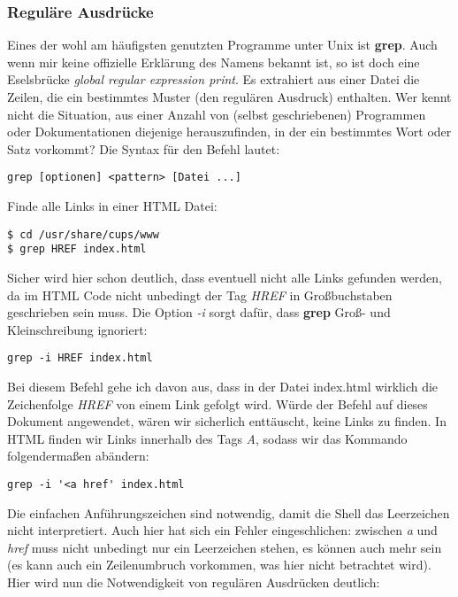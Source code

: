 \documentclass[titlepage,a4paper]{article}
\begin{document}
\subsubsection*{Reguläre Ausdrücke}
\label{sec:regex}

Eines der wohl am häufigsten genutzten Programme unter Unix ist \textbf{grep}.  Auch
wenn mir keine offizielle Erklärung des Namens bekannt ist, so ist doch eine
Eselsbrücke \emph{global regular expression print}.  Es extrahiert aus einer
Datei die Zeilen, die ein bestimmtes Muster (den regulären Ausdruck)
enthalten.  Wer kennt nicht die Situation, aus einer Anzahl von (selbst
geschriebenen) Programmen oder Dokumentationen diejenige herauszufinden, in
der ein bestimmtes Wort oder Satz vorkommt?  Die Syntax für den Befehl lautet:

\begin{verbatim}
grep [optionen] <pattern> [Datei ...]
\end{verbatim}

Finde alle Links in einer HTML Datei:

\begin{verbatim}
$ cd /usr/share/cups/www
$ grep HREF index.html
\end{verbatim}

Sicher wird hier schon deutlich, dass eventuell nicht alle Links gefunden
werden, da im HTML Code nicht unbedingt der Tag \emph{HREF} in Großbuchstaben
geschrieben sein muss.  Die Option \emph{-i} sorgt dafür, dass \textbf{grep}
Groß- und Kleinschreibung ignoriert:

\begin{verbatim}
grep -i HREF index.html
\end{verbatim}

Bei diesem Befehl gehe ich davon aus, dass in der Datei index.html wirklich die
Zeichenfolge \emph{HREF} von einem Link gefolgt wird.  Würde der Befehl auf
dieses Dokument angewendet, wären wir sicherlich enttäuscht, keine Links zu
finden.  In HTML finden wir Links innerhalb des Tags \emph{A}, sodass wir das
Kommando folgendermaßen abändern:

\begin{verbatim}
grep -i '<a href' index.html
\end{verbatim}

Die einfachen Anführungszeichen sind notwendig, damit die Shell das
Leerzeichen nicht interpretiert.  Auch hier hat sich ein Fehler
eingeschlichen: zwischen \emph{a} und \emph{href} muss nicht unbedingt nur ein
Leerzeichen stehen, es können auch mehr sein (es kann auch ein Zeilenumbruch
vorkommen, was hier nicht betrachtet wird).  Hier wird nun die Notwendigkeit
von regulären Ausdrücken deutlich: 
\end{document}
